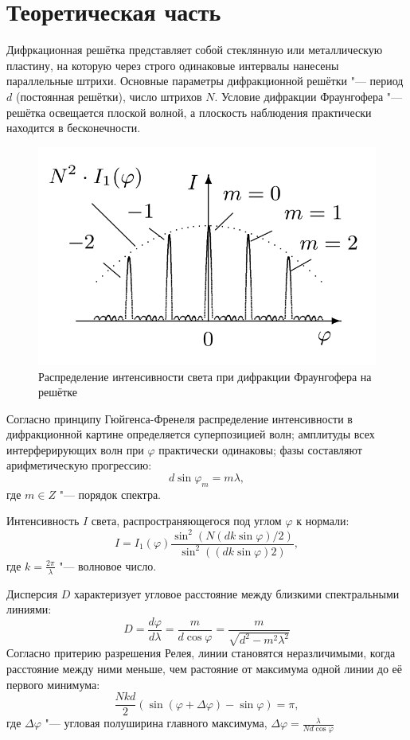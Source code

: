 \documentclass[a4paper,12pt]{article}
\begin{document}
\section*{Теоретическая часть}
Дифркационная решётка представляет собой стеклянную или металлическую пластину, на которую через строго одинаковые интервалы нанесены параллельные штрихи. Основные параметры дифракционной решётки "--- период $d$ (постоянная решётки), число штрихов $N$.
Условие дифракции Фраунгофера "--- решётка освещается плоской волной, а плоскость наблюдения практически находится в бесконечности.

\begin{figure}[h!]
	\begin{center}
    		\includegraphics[scale = 0.5]{fig1}
    		\caption{Распределение интенсивности света при дифракции Фраунгофера на решётке}
	\end{center}
\end{figure}
Согласно принципу Гюйгенса-Френеля распределение интенсивности в дифракционной картине определяется суперпозицией волн; амплитуды всех интерферирующих волн при $\varphi$ практически одинаковы; фазы составляют арифметическую прогрессию:
\[
    d \sin \varphi_m = m \lambda,
 \]
 где $m \in Z$ "--- порядок спектра.
 
 Интенсивность $I$ света, распространяющегося под углом $\varphi$ к нормали:
 \[
 I = I_1(\varphi)\frac{\sin^2 (N(dk \sin \varphi) / 2)}{\sin^2 ((dk \sin \varphi) 2)},
 \]
 где $k = \frac{2 \pi}{\lambda}$ "--- волновое число.
 
 Дисперсия $D$ характеризует угловое расстояние между близкими спектральными линиями:
 \[
 D = \frac{d \varphi}{d \lambda} = \frac{m}{d \cos \varphi} = \frac{m}{\sqrt{d^2 - m^2 \lambda^2}}
 \]
 Согласно притерию разрешения Релея, линии становятся неразличимыми, когда расстояние между ними меньше, чем растояние от максимума одной линии до её первого минимума:
 \[
    \frac{Nkd}{2}(\sin (\varphi + \Delta \varphi) - \sin \varphi) = \pi,
 \]
 где $\Delta \varphi$ "--- угловая полуширина главного максимума, $\Delta \varphi = \frac{\lambda}{Nd \cos \varphi}$
 
\end{document}
